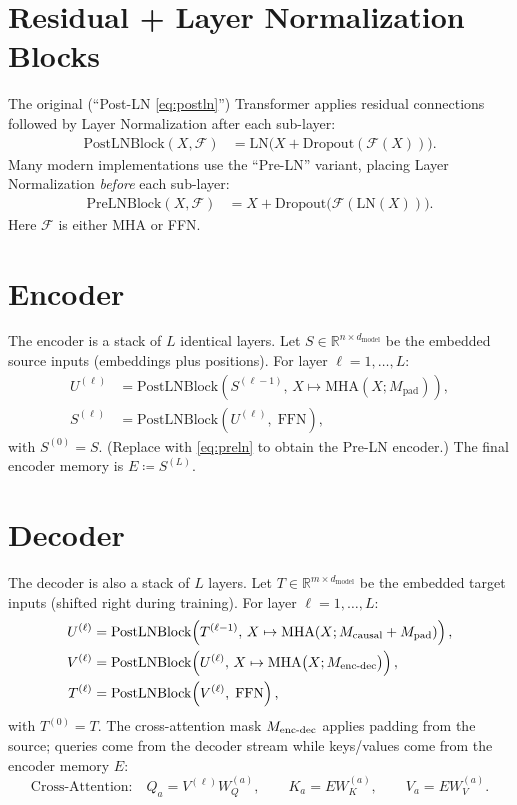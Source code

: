 \documentclass[11pt]{article}
\begin{document}
\section{Residual + Layer Normalization Blocks}
The original (``Post-LN \eqref{eq:postln}'') Transformer applies residual connections followed by Layer Normalization after each sub-layer:
\begin{align}
\mathrm{PostLNBlock}(X,\mathcal{F}) &= \mathrm{LN}\!\big(X + \mathrm{Dropout}(\mathcal{F}(X))\big).\label{eq:postln}
\end{align}
Many modern implementations use the ``Pre-LN'' variant, placing Layer Normalization \emph{before} each sub-layer:
\begin{align}
\mathrm{PreLNBlock}(X,\mathcal{F}) &= X + \mathrm{Dropout}\!\big(\mathcal{F}(\mathrm{LN}(X))\big).\label{eq:preln}
\end{align}
Here $\mathcal{F}$ is either MHA or FFN.

\section{Encoder}
The encoder is a stack of $L$ identical layers. Let $S\in\mathbb{R}^{n\times d_{\text{model}}}$ be the embedded source inputs (embeddings plus positions). For layer $\ell=1,\dots,L$:
\begin{align}
U^{(\ell)} &= \mathrm{PostLNBlock}\!\left(S^{(\ell-1)},\, X\mapsto \mathrm{MHA}(X;M_{\text{pad}})\right), \\
S^{(\ell)} &= \mathrm{PostLNBlock}\!\left(U^{(\ell)},\; \mathrm{FFN}\right),
\label{eq:postln_stack}
\end{align}
with $S^{(0)}=S$. (Replace with \eqref{eq:preln} to obtain the Pre-LN encoder.) The final encoder memory is $E \coloneqq S^{(L)}$.

\section{Decoder}
The decoder is also a stack of $L$ layers. Let $T\in\mathbb{R}^{m\times d_{\text{model}}}$ be the embedded target inputs (shifted right during training). For layer $\ell=1,\dots,L$:
\begin{align}
U^{(\ell)} &= \mathrm{PostLNBlock}\!\left(T^{(\ell-1)},\, X\mapsto \mathrm{MHA}(X;M_{\text{causal}} + M_{\text{pad}})\right), \\
V^{(\ell)} &= \mathrm{PostLNBlock}\!\left(U^{(\ell)},\, X\mapsto \mathrm{MHA}\big(X;M_{\text{enc\text{-}dec}}\big)\right), \\
T^{(\ell)} &= \mathrm{PostLNBlock}\!\left(V^{(\ell)},\; \mathrm{FFN}\right),
\label{eq:postln_stack_2}
\end{align}
with $T^{(0)}=T$. The cross-attention mask $M_{\text{enc\text{-}dec}}$ applies padding from the source; queries come from the decoder stream while keys/values come from the encoder memory $E$:
\begin{equation}
\text{Cross-Attention:}\quad Q_a = V^{(\ell)}W_Q^{(a)},\qquad K_a = E W_K^{(a)},\qquad V_a = E W_V^{(a)}.
\label{eq:qkv_cross}
\end{equation}
\end{document}
